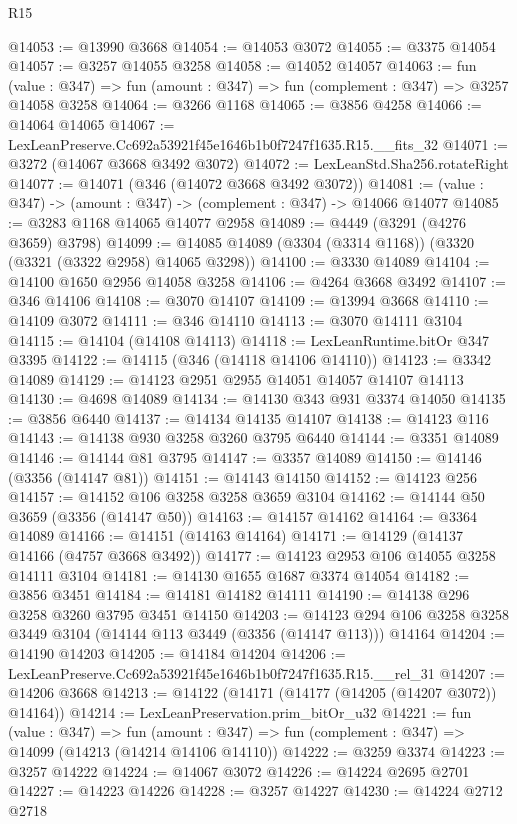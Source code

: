 \begin{lexlean}{R15}
\begin{coremodule}
@14053 := @13990 @3668
@14054 := @14053 @3072
@14055 := @3375 @14054
@14057 := @3257 @14055 @3258
@14058 := @14052 @14057
@14063 := fun (value : @347) => fun (amount : @347) => fun (complement : @347) => @3257 @14058 @3258
@14064 := @3266 @1168
@14065 := @3856 @4258
@14066 := @14064 @14065
@14067 := LexLeanPreserve.Cc692a53921f45e1646b1b0f7247f1635.R15.__fits_32
@14071 := @3272 (@14067 @3668 @3492 @3072)
@14072 := LexLeanStd.Sha256.rotateRight
@14077 := @14071 (@346 (@14072 @3668 @3492 @3072))
@14081 := (value : @347) -> (amount : @347) -> (complement : @347) -> @14066 @14077
@14085 := @3283 @1168 @14065 @14077 @2958
@14089 := @4449 (@3291 (@4276 @3659) @3798)
@14099 := @14085 @14089 (@3304 (@3314 @1168)) (@3320 (@3321 (@3322 @2958) @14065 @3298))
@14100 := @3330 @14089
@14104 := @14100 @1650 @2956 @14058 @3258
@14106 := @4264 @3668 @3492
@14107 := @346 @14106
@14108 := @3070 @14107
@14109 := @13994 @3668
@14110 := @14109 @3072
@14111 := @346 @14110
@14113 := @3070 @14111 @3104
@14115 := @14104 (@14108 @14113)
@14118 := LexLeanRuntime.bitOr @347 @3395
@14122 := @14115 (@346 (@14118 @14106 @14110))
@14123 := @3342 @14089
@14129 := @14123 @2951 @2955 @14051 @14057 @14107 @14113
@14130 := @4698 @14089
@14134 := @14130 @343 @931 @3374 @14050
@14135 := @3856 @6440
@14137 := @14134 @14135 @14107
@14138 := @14123 @116
@14143 := @14138 @930 @3258 @3260 @3795 @6440
@14144 := @3351 @14089
@14146 := @14144 @81 @3795
@14147 := @3357 @14089
@14150 := @14146 (@3356 (@14147 @81))
@14151 := @14143 @14150
@14152 := @14123 @256
@14157 := @14152 @106 @3258 @3258 @3659 @3104
@14162 := @14144 @50 @3659 (@3356 (@14147 @50))
@14163 := @14157 @14162
@14164 := @3364 @14089
@14166 := @14151 (@14163 @14164)
@14171 := @14129 (@14137 @14166 (@4757 @3668 @3492))
@14177 := @14123 @2953 @106 @14055 @3258 @14111 @3104
@14181 := @14130 @1655 @1687 @3374 @14054
@14182 := @3856 @3451
@14184 := @14181 @14182 @14111
@14190 := @14138 @296 @3258 @3260 @3795 @3451 @14150
@14203 := @14123 @294 @106 @3258 @3258 @3449 @3104 (@14144 @113 @3449 (@3356 (@14147 @113))) @14164
@14204 := @14190 @14203
@14205 := @14184 @14204
@14206 := LexLeanPreserve.Cc692a53921f45e1646b1b0f7247f1635.R15.__rel_31
@14207 := @14206 @3668
@14213 := @14122 (@14171 (@14177 (@14205 (@14207 @3072)) @14164))
@14214 := LexLeanPreservation.prim_bitOr_u32
@14221 := fun (value : @347) =>
  fun (amount : @347) => fun (complement : @347) => @14099 (@14213 (@14214 @14106 @14110))
@14222 := @3259 @3374
@14223 := @3257 @14222
@14224 := @14067 @3072
@14226 := @14224 @2695 @2701
@14227 := @14223 @14226
@14228 := @3257 @14227
@14230 := @14224 @2712 @2718

\end{coremodule}
\end{lexlean}
